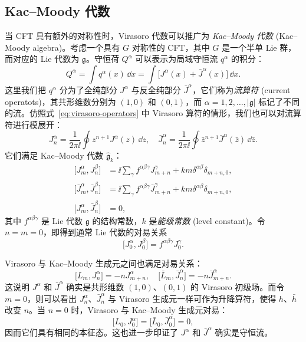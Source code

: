 \subsection{Kac--Moody 代数}

当 CFT 具有额外的对称性时，Virasoro 代数可以推广为 \emph{Kac--Moody 代数} (Kac--Moody algebra)\cite{goddard1986kac,wang2022emergence}。考虑一个具有 $G$ 对称性的 CFT，其中 $G$ 是一个半单 Lie 群，而对应的 Lie 代数为 $\mathfrak{g}$。守恒荷 $Q^\alpha$ 可以表示为局域守恒流 $q^\alpha$ 的积分：
\begin{equation}
  Q^\alpha = \int q^\alpha(x) \, \dd{x} = \int \bigl[ J^\alpha(x) + \bar{J}^\alpha(x) \bigr] \, \dd{x}.
\end{equation}
这里我们把 $q^\alpha$ 分为了全纯部分 $J^\alpha$ 与反全纯部分 $\bar{J}^\alpha$，它们称为\emph{流算符} (current operatots)，其共形维数分别为 $(1,0)$ 和 $(0,1)$，而 $\alpha=1,2,\ldots,|\mathfrak{g}|$ 标记了不同的流。仿照式~\eqref{eq:virasoro-operators} 中 Virasoro 算符的情形，我们也可以对流算符进行模展开：
\begin{equation}
  J^\alpha_n = \frac{1}{2\pi\ii} \oint z^{n+1} J^\alpha(z) \, \dd z, \quad
  \bar{J}^\alpha_n = \frac{1}{2\pi\ii} \oint \bar{z}^{n+1} \bar{J}^\alpha(\bar{z}) \, \dd\bar{z}.
\end{equation}
它们满足 Kac--Moody 代数 $\hat{\mathfrak{g}}_k$：
\begin{equation}
  \begin{aligned}
    \bigl[ J^\alpha_m, J^\beta_n \bigr]
      &= \ii \sum_\gamma f^{\alpha\beta\gamma} J^\gamma_{m+n} + km \delta^{\alpha\beta} \delta_{m+n,0}, \\
    \bigl[ \bar{J}^\alpha_m, \bar{J}^\beta_n \bigr]
      &= \ii \sum_\gamma f^{\alpha\beta\gamma} \bar{J}^\gamma_{m+n} + km \delta^{\alpha\beta} \delta_{m+n,0}, \\
    \bigl[ J^\alpha_m, \bar{J}^\beta_n \bigr] &= 0,
  \end{aligned}
  \label{eq:kac-moody-algebra}
\end{equation}
其中 $f^{\alpha\beta\gamma}$ 是 Lie 代数 $\mathfrak{g}$ 的结构常数，$k$ 是\emph{能级常数} (level constant)。令 $n=m=0$，即得到通常 Lie 代数的对易关系
\begin{equation}
  \bigl[ J^\alpha_0, J^\beta_0 \bigr] = f^{\alpha\beta\gamma} J^\gamma_0.
\end{equation}

Virasoro 与 Kac--Moody 生成元之间也满足对易关系：
\begin{equation}
  \bigl[ L_m, J^\alpha_n \bigr] = -n J^\alpha_{m+n}, \quad
  \bigl[ \bar{L}_m, \bar{J}^\alpha_n \bigr] = -n \bar{J}^\alpha_{m+n}.
\end{equation}
这说明 $J^\alpha$ 和 $\bar{J}^\alpha$ 确实是共形维数 $(1,0)$、$(0,1)$ 的 Virasoro 初级场。而令 $m=0$，则可以看出 $J^\alpha_n$、$\bar{J}^\alpha_n$ 与 Virasoro 生成元一样可作为升降算符，使得 $h$、$\bar{h}$ 改变 $n$。当 $n=0$ 时，Virasoro 与 Kac--Moody 生成元对易：
\begin{equation}
  \bigl[ L_0, J^\alpha_0 \bigr] = \bigl[ \bar{L}_0, \bar{J}^\alpha_0 \bigr] = 0,
\end{equation}
因而它们具有相同的本征态。这也进一步印证了 $J^\alpha$ 和 $\bar{J}^\alpha$ 确实是守恒流。

